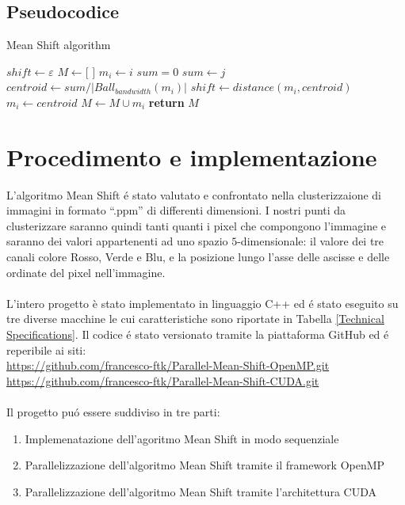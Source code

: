 \documentclass{article}
\begin{document}
\newpage


\subsection{Pseudocodice} \label{Pseudocodice}
\begin{algorithm}
\caption{Mean Shift algorithm}\label{euclid}
\begin{algorithmic}[1]
\State $shift\gets\varepsilon $
\State $M\gets[$ $] $
\State $ m_{i} \gets i $
\State $sum=0$
\State $sum\gets j$
\EndFor
\State $centroid\gets sum/|Ball_{bandwidth}(m_{i})|$
\State $shift \gets distance(m_{i},centroid)$
\State $m_{i} \gets centroid$
\EndWhile\label{euclidendwhile}
\State $M \gets M\cup m_{i}$
\EndFor
\State \textbf{return} $M$
\EndProcedure
\end{algorithmic}
\end{algorithm}

\section{Procedimento e implementazione}

L'algoritmo Mean Shift \'e stato valutato e confrontato nella clusterizzaione di immagini in formato “.ppm” di differenti dimensioni. I nostri punti da clusterizzare saranno quindi tanti quanti i pixel che compongono l'immagine e saranno dei valori appartenenti ad uno spazio $5$-dimensionale: il valore dei tre canali colore Rosso, Verde e Blu, e la posizione lungo l'asse delle ascisse e delle ordinate del pixel nell'immagine.\\
\\
\noindent L'intero progetto è stato implementato in linguaggio C++ ed \'e stato eseguito su tre diverse macchine le cui caratteristiche sono riportate in Tabella \ref{Technical Specifications}. Il codice \'e stato versionato tramite la piattaforma GitHub ed \'e reperibile ai siti:\\
\url{https://github.com/francesco-ftk/Parallel-Mean-Shift-OpenMP.git} \\
\url{https://github.com/francesco-ftk/Parallel-Mean-Shift-CUDA.git}\\
\\
\noindent Il progetto pu\'o essere suddiviso in tre parti:
\begin{enumerate}
\item Implemenatazione dell'agoritmo Mean Shift in modo sequenziale
\item Parallelizzazione dell'algoritmo Mean Shift tramite il framework OpenMP
\item Parallelizzazione dell'algoritmo Mean Shift tramite l'architettura CUDA
\end{enumerate}
\end{document}
